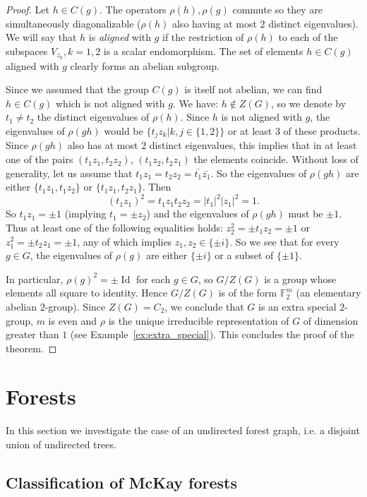 \documentclass[ALCO]{cedram}
\newcommand{\id}{\operatorname{Id}}
\newcommand{\abs}[1]{\left|{#1}\right|}
\begin{document}
\begin{proof}
Let $h\in C(g)$. The operators $\rho(h), \rho(g)$ commute so they are simultaneously diagonalizable ($\rho(h)$ also having at most $2$ distinct eigenvalues). We will say that $h$ is {\it aligned} with $g$ if the restriction of $\rho(h)$ to each of the subspaces $V_{z_k}, k=1,2$ is a scalar endomorphism. The set of elements $h\in C(g)$ aligned with $g$ clearly forms an abelian subgroup.

Since we assumed that the group $C(g)$ is itself not abelian, we can find $h \in C(g)$ which is not aligned with $g$. We have: $h\notin Z(G)$, so we denote by $t_1 \neq t_2$ the distinct eigenvalues of $\rho(h)$. Since $h$ is not aligned with $g$, the eigenvalues of $\rho(gh)$ would be $\{t_j z_k |k, j\in \{1,2\}\}$ or at least $3$ of these products. {Since $\rho(gh)$ also has at most $2$ distinct eigenvalues, this} implies that in at least one of the pairs $(t_1 z_1, t_2 z_2)$, $(t_1 z_2, t_2 z_1)$ the elements coincide. {Without loss of generality, let us assume that $t_1z_1 = t_2z_2 = \bar{t_1}\bar{z_1}$. So the eigenvalues of $\rho(gh)$ are either $\{t_1z_1, t_1z_2\}$ or $\{t_1z_1, t_2z_1\}$. Then $$ (t_1 z_1)^2= t_1 z_1 t_2 z_2 =\abs{t_1}^2 \abs{z_1}^2 = 1 .$$ 
So $t_1z_1 = \pm 1$ (implying $t_1 = \pm z_2$) and the eigenvalues of $\rho(gh)$ must be $\pm 1$. Thus at least one of the following equalities holds: $ z_2^2 = \pm t_1 z_2 = \pm 1$ or $z_1^2 = \pm t_2 z_1 = \pm 1$, any of which implies} $z_1, z_2 \in \{\pm i\}$. So we see that for every $g\in G$, the eigenvalues of $\rho(g)$ are either $\{\pm i\}$ or a subset of $\{\pm 1\}$.

In particular, $\rho(g)^2 = \pm \id$ for each $g\in G$, so $G/Z(G)$ is a group {whose elements all square to identity}. {Hence $G/Z(G)$ is} of the form $\mathbb{F}_2^m$ (an elementary abelian $2$-group). Since $Z(G)=C_2$, we conclude that $G$ is an extra special $2$-group, $m$ is even and $\rho$ is the unique irreducible representation of $G$ of dimension greater than $1$ (see Example~\ref{ex:extra_special}). This concludes the proof of the theorem.

\end{proof}

\section{Forests}\label{sec:forests}
In this section we investigate the case of an undirected forest graph, i.e. a disjoint union of undirected trees.

\subsection{Classification of McKay forests}
\end{document}
